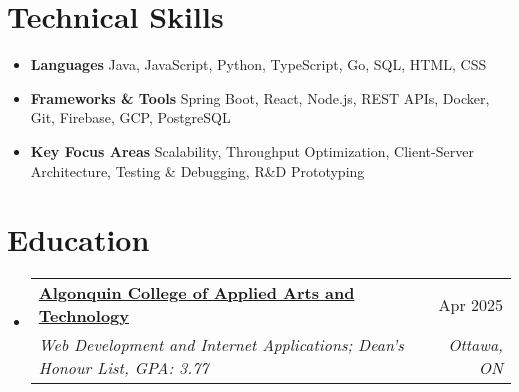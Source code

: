 \documentclass[letterpaper,11pt]{article}
\makeatletter
\newcommand{\resumeItem}[1]{\item\small{#1 \vspace{-2pt}}}
\newcommand{\resumeSubheading}[4]{
  \vspace{-1pt}\item
    \begin{tabular*}{0.97\textwidth}[t]{l@{\extracolsep{\fill}}r}
      \textbf{#1} & #2 \\
      \textit{\small#3} & \textit{\small #4} \\
    \end{tabular*}\vspace{-5pt}
}
\newcommand{\resumeSubHeadingListStart}{\begin{itemize}[leftmargin=*]}
\newcommand{\resumeSubHeadingListEnd}{\end{itemize}}
\newcommand{\resumeItemListStart}{\begin{itemize}}
\newcommand{\resumeItemListEnd}{\end{itemize}\vspace{-5pt}}
\makeatother
\begin{document}
\section{Technical Skills}
  \resumeItemListStart
    \resumeItem{\textbf{Languages}}{Java, JavaScript, Python, TypeScript, Go, SQL, HTML, CSS}
    \resumeItem{\textbf{Frameworks \& Tools}}{Spring Boot, React, Node.js, REST APIs, Docker, Git, Firebase, GCP, PostgreSQL}
    \resumeItem{\textbf{Key Focus Areas}}{Scalability, Throughput Optimization, Client-Server Architecture, Testing \& Debugging, R\&D Prototyping}
  \resumeItemListEnd

\section{Education}
  \resumeSubHeadingListStart
    \resumeSubheading
      {\href{https://www.algonquincollege.com/sat/program/web-development-internet-applications/}{Algonquin College of Applied Arts and Technology}}{Apr 2025}
      {Web Development and Internet Applications; Dean's Honour List, GPA: 3.77}{Ottawa, ON}
  \resumeSubHeadingListEnd
\end{document}
